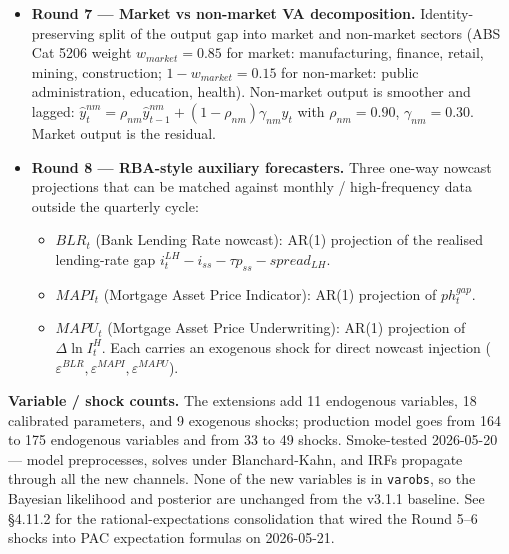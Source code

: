 \documentclass[
]{article}
\providecommand{\tightlist}{%
  \setlength{\itemsep}{0pt}\setlength{\parskip}{0pt}}
\begin{document}
\begin{itemize}
  \begin{itemize}
  \tightlist
  \item
    GST pass-through to the consumer-price deflator:
    \(\pi^c_t = \dots + \alpha_{GST} \tau^{GST,gap}_t\) with
    \(\alpha_{GST} = 0.05\).
  \item
    PAYG drag on consumption growth via the income-tax change:
    \(\overline{\Delta \ln C^*}_t = \dots - \alpha_{PAYG} \Delta \tau^{PAYG,gap}_t\)
    with \(\alpha_{PAYG} = 0.10\).
  \item
    CIT bump to the user cost of capital:
    \(UC^K_t = WACC_t + \delta_K - (\pi^{IB}_t - \pi^Q_t) + \alpha_{CIT} \tau^{CIT,gap}_t\)
    with \(\alpha_{CIT} = 0.02\).
  \end{itemize}
\item
  \textbf{Round 7 --- Market vs non-market VA decomposition.}
  Identity-preserving split of the output gap into market and non-market
  sectors (ABS Cat 5206 weight \(w_{market} = 0.85\) for market:
  manufacturing, finance, retail, mining, construction;
  \(1-w_{market} = 0.15\) for non-market: public administration,
  education, health). Non-market output is smoother and lagged:
  \(\hat{y}^{nm}_t = \rho_{nm} \hat{y}^{nm}_{t-1} + (1-\rho_{nm}) \gamma_{nm} \hat{y}_t\)
  with \(\rho_{nm} = 0.90\), \(\gamma_{nm} = 0.30\). Market output is
  the residual.
\item
  \textbf{Round 8 --- RBA-style auxiliary forecasters.} Three one-way
  nowcast projections that can be matched against monthly /
  high-frequency data outside the quarterly cycle:

  \begin{itemize}
  \tightlist
  \item
    \(BLR_t\) (Bank Lending Rate nowcast): AR(1) projection of the
    realised lending-rate gap
    \(i^{LH}_t - i_{ss} - \tau p_{ss} - spread_{LH}\).
  \item
    \(MAPI_t\) (Mortgage Asset Price Indicator): AR(1) projection of
    \(ph^{gap}_t\).
  \item
    \(MAPU_t\) (Mortgage Asset Price Underwriting): AR(1) projection of
    \(\Delta \ln I^H_t\). Each carries an exogenous shock for direct
    nowcast injection
    (\(\varepsilon^{BLR}, \varepsilon^{MAPI}, \varepsilon^{MAPU}\)).
  \end{itemize}
\end{itemize}

\textbf{Variable / shock counts.} The extensions add 11 endogenous
variables, 18 calibrated parameters, and 9 exogenous shocks; production
model goes from 164 to 175 endogenous variables and from 33 to 49
shocks. Smoke-tested 2026-05-20 --- model preprocesses, solves under
Blanchard-Kahn, and IRFs propagate through all the new channels. None of
the new variables is in \texttt{varobs}, so the Bayesian likelihood and
posterior are unchanged from the v3.1.1 baseline. See §4.11.2 for the
rational-expectations consolidation that wired the Round 5--6 shocks
into PAC expectation formulas on 2026-05-21.
\end{document}
